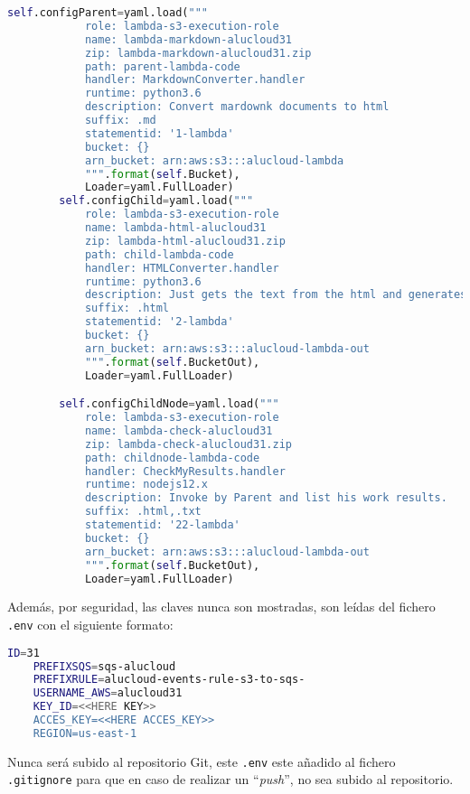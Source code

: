 \documentclass[
]{article}
\begin{document}
\begin{lstlisting}[language=Python, caption=Configuraciones de la clase SettingsAlucloud31]
self.configParent=yaml.load("""
            role: lambda-s3-execution-role
            name: lambda-markdown-alucloud31
            zip: lambda-markdown-alucloud31.zip
            path: parent-lambda-code
            handler: MarkdownConverter.handler
            runtime: python3.6
            description: Convert mardownk documents to html
            suffix: .md
            statementid: '1-lambda'
            bucket: {}
            arn_bucket: arn:aws:s3:::alucloud-lambda
            """.format(self.Bucket), 
            Loader=yaml.FullLoader)
        self.configChild=yaml.load("""
            role: lambda-s3-execution-role
            name: lambda-html-alucloud31
            zip: lambda-html-alucloud31.zip
            path: child-lambda-code
            handler: HTMLConverter.handler
            runtime: python3.6
            description: Just gets the text from the html and generates a txt file
            suffix: .html
            statementid: '2-lambda'
            bucket: {}
            arn_bucket: arn:aws:s3:::alucloud-lambda-out
            """.format(self.BucketOut), 
            Loader=yaml.FullLoader)

        self.configChildNode=yaml.load("""
            role: lambda-s3-execution-role
            name: lambda-check-alucloud31
            zip: lambda-check-alucloud31.zip
            path: childnode-lambda-code
            handler: CheckMyResults.handler
            runtime: nodejs12.x
            description: Invoke by Parent and list his work results.
            suffix: .html,.txt
            statementid: '22-lambda'
            bucket: {}
            arn_bucket: arn:aws:s3:::alucloud-lambda-out
            """.format(self.BucketOut), 
            Loader=yaml.FullLoader)
\end{lstlisting}

Además, por seguridad, las claves nunca son mostradas, son leídas del
fichero \texttt{.env} con el siguiente formato:

\begin{lstlisting}[language=bash,caption={Contenido de .env}]
	ID=31
	PREFIXSQS=sqs-alucloud
	PREFIXRULE=alucloud-events-rule-s3-to-sqs-
	USERNAME_AWS=alucloud31
	KEY_ID=<<HERE KEY>>
	ACCES_KEY=<<HERE ACCES_KEY>>
	REGION=us-east-1
\end{lstlisting}

Nunca será subido al repositorio Git, este \texttt{.env} este añadido al
fichero \texttt{.gitignore} para que en caso de realizar un
``\emph{push}'', no sea subido al repositorio.
\end{document}
